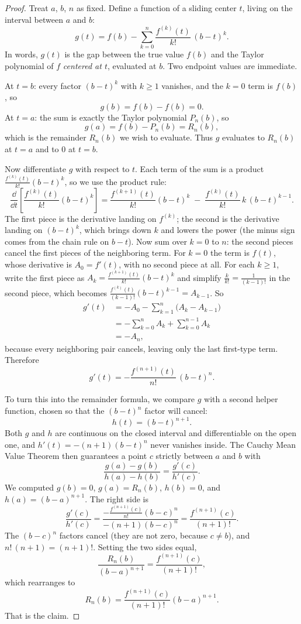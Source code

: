 \begin{proof}
Treat $a$, $b$, $n$ as fixed. Define a function of a sliding center $t$, living on
the interval between $a$ and $b$:
\[
  g(t) = f(b) - \sum_{k=0}^{n} \frac{f^{(k)}(t)}{k!}\,(b-t)^k.
\]
In words, $g(t)$ is the gap between the true value $f(b)$ and the Taylor
polynomial of $f$ \emph{centered at $t$}, evaluated at $b$. Two endpoint values are
immediate.

At $t = b$: every factor $(b-t)^k$ with $k \ge 1$ vanishes, and the $k=0$ term is
$f(b)$, so
\[
  g(b) = f(b) - f(b) = 0.
\]
At $t = a$: the sum is exactly the Taylor polynomial $P_n(b)$, so
\[
  g(a) = f(b) - P_n(b) = R_n(b),
\]
which is the remainder $R_n(b)$ we wish to evaluate. Thus $g$ evaluates to $R_n(b)$
at $t=a$ and to $0$ at $t=b$.

Now differentiate $g$ with respect to $t$. Each term of the sum is a product $\frac{f^{(k)}(t)}{k!}(b-t)^k$, so we use the
product rule:
\[
  \frac{\dd}{\dd t}\!\left[\frac{f^{(k)}(t)}{k!}(b-t)^k\right]
  = \frac{f^{(k+1)}(t)}{k!}(b-t)^k
    \;-\; \frac{f^{(k)}(t)}{k!}\,k\,(b-t)^{k-1}.
\]
The first piece is the derivative landing on $f^{(k)}$; the second is the derivative
landing on $(b-t)^k$, which brings down $k$ and lowers the power (the minus sign
comes from the chain rule on $b-t$). Now sum over $k = 0$ to $n$: the
second pieces cancel the first pieces of the neighboring term. For $k=0$ the term is
$f(t)$, whose derivative is $A_0 = f'(t)$, with no second piece at all. For each
$k\ge 1$, write the first piece as $A_k = \frac{f^{(k+1)}(t)}{k!}(b-t)^k$ and simplify
$\frac{k}{k!} = \frac{1}{(k-1)!}$ in the second piece, which becomes
$\frac{f^{(k)}(t)}{(k-1)!}(b-t)^{k-1} = A_{k-1}$. So
\begin{align*}
  g'(t) &= -A_0 - \sum_{k=1}^{n}\big(A_k - A_{k-1}\big) \\
        &= -\sum_{k=0}^{n} A_k + \sum_{k=0}^{n-1} A_k \\
        &= -A_n,
\end{align*}
because every neighboring pair cancels, leaving only the last first-type term.
Therefore
\[
  g'(t) = -\frac{f^{(n+1)}(t)}{n!}\,(b-t)^n.
\]

To turn this into the remainder formula, we compare $g$ with a second helper function,
chosen so that the $(b-t)^n$ factor will cancel:
\[
  h(t) = (b-t)^{n+1}.
\]
Both $g$ and $h$ are continuous on the closed interval and differentiable on the open
one, and $h'(t) = -(n+1)(b-t)^n$ never vanishes inside. The Cauchy Mean
Value Theorem then guarantees a point $c$ strictly between $a$ and $b$ with
\[
  \frac{g(a) - g(b)}{h(a) - h(b)} = \frac{g'(c)}{h'(c)}.
\]
We computed $g(b) = 0$, $g(a) = R_n(b)$, $h(b) = 0$, and $h(a) = (b-a)^{n+1}$. The
right side is
\[
  \frac{g'(c)}{h'(c)}
  = \frac{-\frac{f^{(n+1)}(c)}{n!}(b-c)^n}{-(n+1)(b-c)^n}
  = \frac{f^{(n+1)}(c)}{(n+1)!}.
\]
The $(b-c)^n$ factors cancel (they are not zero, because $c \ne b$), and
$n!\,(n+1) = (n+1)!$. Setting the two sides equal,
\[
  \frac{R_n(b)}{(b-a)^{n+1}} = \frac{f^{(n+1)}(c)}{(n+1)!},
\]
which rearranges to
\[
  R_n(b) = \frac{f^{(n+1)}(c)}{(n+1)!}(b-a)^{n+1}.
\]
That is the claim.
\end{proof}

